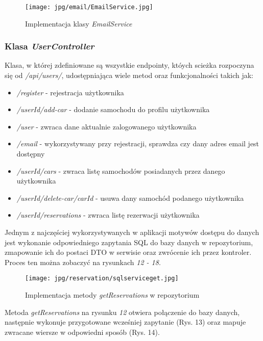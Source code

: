 \documentclass[11pt,a4paper]{article}
\begin{document}
\begin{figure}[H]
    \centering
    \texttt{[image: jpg/email/EmailService.jpg]}
    \caption{Implementacja klasy \textsl{EmailService} }
\end{figure}

\subsubsection{Klasa \textsl{UserController}}
Klasa, w której zdefiniowane są wszystkie endpointy, któych scieżka rozpoczyna się od \textsl{/api/users/}, udostępniająca wiele metod oraz funkcjonalności takich jak:

\begin{itemize}
    \item \textsl{/register} - rejestracja użytkownika
    \item \textsl{/{userId}/add-car} - dodanie samochodu do profilu użytkownika
    \item \textsl{/user} - zwraca dane aktualnie zalogowanego użytkownika
    \item \textsl{/email} - wykorzystywany przy rejestracji, sprawdza czy dany adres email jest dostępny
    \item \textsl{/{userId}/cars} - zwraca listę samochodów posiadanych przez danego użytkownika
    \item \textsl{/{userId}/delete-car/{carId}} - usuwa dany samochód podanego użytkownika
    \item \textsl{/{userId}/reservations} - zwraca listę rezerwacji użytkownika 
\end{itemize}

\noindent
Jednym z najczęściej wykorzystywanych w aplikacji motywów dostępu do danych jest wykonanie odpowiedniego zapytania SQL do bazy danych w repozytorium, zmapowanie ich do postaci DTO w serwisie oraz zwrócenie ich przez kontroler. Proces ten można zobaczyć na rysunkach \textsl{12 - 18}.

\begin{figure}[H]
    \centering
    \texttt{[image: jpg/reservation/sqlserviceget.jpg]}
    \caption{Implementacja metody \textsl{getReservations} w repozytorium}
\end{figure}

\noindent
Metoda \textsl{getReservations} na rysunku \textsl{12} otwiera połączenie do bazy danych, następnie wykonuje przygotowane wcześniej zapytanie (Rys. 13) oraz mapuje zwracane wiersze w odpowiedni sposób (Rys. 14).
\end{document}
